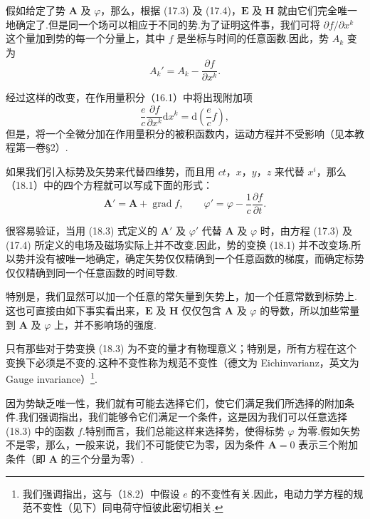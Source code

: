假如给定了势 $\boldsymbol{A}$ 及 $\varphi$，那么，根据 (17.3) 及 (17.4)，$\boldsymbol{E}$ 及
$\boldsymbol{H}$ 就由它们完全唯一地确定了.但是同一个场可以相应于不同的势.为了证明这件事，我们可将
$\partial f/\partial x^k$ 这个量加到势的每一个分量上，其中 $f$ 是坐标与时间的任意函数.因此，势 $A_k$ 变为
\begin{equation}
  A_k'=A_k-\frac{\partial f}{\partial x^k}.
\end{equation}

经过这样的改变，在作用量积分（16.1）中将出现附加项
\begin{equation}
  \frac{e}{c}\frac{\partial f}{\partial x^k}\mathrm{d}x^k
  =\mathrm{d}\left(\frac{e}{c}f\right),
\end{equation}
但是，将一个全微分加在作用量积分的被积函数内，运动方程并不受影响（见本教程第一卷§2）.

如果我们引入标势及矢势来代替四维势，而且用 $ct$，$x$，$y$，$z$ 来代替 $x^i$，那么（18.1）中的四个方程就可以写成下面的形式：
\begin{equation}
  \boldsymbol{A}'=\boldsymbol{A}+\operatorname{grad}f,\qquad
  \varphi'=\varphi-\frac{1}{c}\frac{\partial f}{\partial t}.
\end{equation}

很容易验证，当用 (18.3) 式定义的 $\boldsymbol{A}'$ 及 $\varphi'$ 代替 $\boldsymbol{A}$ 及
$\varphi$ 时，由方程 (17.3) 及 (17.4) 所定义的电场及磁场实际上并不改变.因此，势的变换 (18.1) 并不改变场.所以势并没有被唯一地确定，确定矢势仅仅精确到一个任意函数的梯度，而确定标势仅仅精确到同一个任意函数的时间导数.

特别是，我们显然可以加一个任意的常矢量到矢势上，加一个任意常数到标势上.这也可直接由如下事实看出来，$\boldsymbol{E}$ 及 $\boldsymbol{H}$ 仅仅包含 $\boldsymbol{A}$ 及 $\varphi$ 的导数，所以加些常量到 $\boldsymbol{A}$ 及 $\varphi$ 上，并不影响场的强度.

只有那些对于势变换 (18.3) 为不变的量才有物理意义；特别是，所有方程在这个变换下必须是不变的.这种不变性称为规范不变性（德文为 Eichinvarianz，英文为 Gauge invariance）\footnote{我们强调指出，这与（18.2）中假设 $e$ 的不变性有关.因此，电动力学方程的规范不变性（见下）同电荷守恒彼此密切相关.}.

因为势缺乏唯一性，我们就有可能去选择它们，使它们满足我们所选择的附加条件.我们强调指出，我们能够令它们满足一个条件，这是因为我们可以任意选择 (18.3) 中的函数 $f$.特别而言，我们总能这样来选择势，使得标势 $\varphi$ 为零.假如矢势不是零，那么，一般来说，我们不可能使它为零，因为条件 $\boldsymbol{A}=0$ 表示三个附加条件（即 $\boldsymbol{A}$ 的三个分量为零）.

